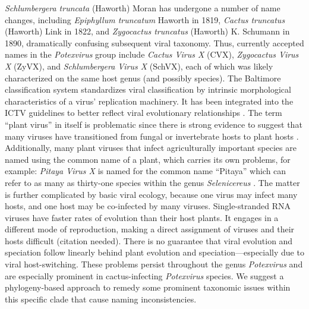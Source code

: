 \documentclass[fleqn,10pt,lineno]{wlpeerj}
\begin{document}
\textit{Schlumbergera truncata} (Haworth) Moran has undergone a number of name changes, including \textit{Epiphyllum truncatum} Haworth in 1819, \textit{Cactus truncatus} (Haworth) Link in 1822, and \textit{Zygocactus truncatus} (Haworth) K. Schumann in 1890, dramatically confusing subsequent viral taxonomy.
Thus, currently accepted names in the \textit{Potexvirus} group include \textit{Cactus Virus X} (CVX), \textit{Zygocactus Virus X} (ZyVX), and \textit{Schlumbergera Virus X} (SchVX), each of which was likely characterized on the same host genus (and possibly species). %
The Baltimore classification system standardizes viral classification by intrinsic morphological characteristics of a virus' replication machinery. 
It has been integrated into the ICTV guidelines to better reflect viral evolutionary relationships \citep{ictv2020}.
The term ``plant virus'' in itself is problematic since there is strong evidence to suggest that many viruses have transitioned from fungal or invertebrate hosts to plant hosts \citep{lefeuvre2019}. %
Additionally, many plant viruses that infect agriculturally important species are named using the common name of a plant, which carries its own problems, for example: \textit{Pitaya Virus X} is named for the common name ``Pitaya'' which can refer to as many as thirty-one species within the genus \textit{Selenicereus} \citep{korotkova_phylogenetic_2017,guerrero_phylogenetic_2019,le_bellec_12_2011}. 
The matter is further complicated by basic viral ecology, because one virus may infect many hosts, and one host may be co-infected by many viruses. 
Single-stranded RNA viruses have faster rates of evolution than their host plants. %
It engages in a different mode of reproduction, making a direct assignment of viruses and their hosts difficult (citation needed).%
There is no guarantee that viral evolution and speciation follow linearly behind plant evolution and speciation---especially due to viral host-switching.
These problems persist throughout the genus \textit{Potexvirus} and are especially prominent in cactus-infecting \textit{Potexvirus} species.
We suggest a phylogeny-based approach to remedy some prominent taxonomic issues within this specific clade that cause naming inconsistencies.
\end{document}
